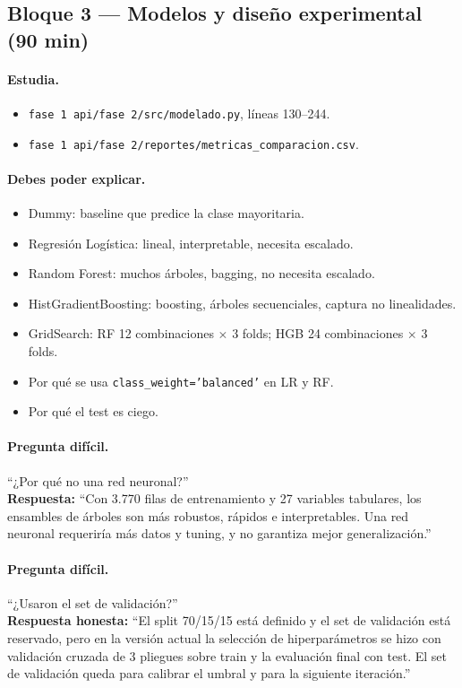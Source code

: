 \documentclass[11pt,a4paper]{article}
\newcommand{\code}[1]{\texttt{#1}}
\begin{document}
\subsection{Bloque 3 --- Modelos y diseño experimental (90 min)}

\paragraph{Estudia.}
\begin{itemize}[leftmargin=*]
  \item \code{fase 1 api/fase 2/src/modelado.py}, líneas 130--244.
  \item \code{fase 1 api/fase 2/reportes/metricas_comparacion.csv}.
\end{itemize}

\paragraph{Debes poder explicar.}
\begin{itemize}[leftmargin=*]
  \item Dummy: baseline que predice la clase mayoritaria.
  \item Regresión Logística: lineal, interpretable, necesita escalado.
  \item Random Forest: muchos árboles, bagging, no necesita escalado.
  \item HistGradientBoosting: boosting, árboles secuenciales, captura no linealidades.
  \item GridSearch: RF 12 combinaciones $\times$ 3 folds; HGB 24 combinaciones $\times$ 3 folds.
  \item Por qué se usa \code{class_weight='balanced'} en LR y RF.
  \item Por qué el test es ciego.
\end{itemize}

\paragraph{Pregunta difícil.}
``¿Por qué no una red neuronal?''\\
\textbf{Respuesta:} ``Con 3.770 filas de entrenamiento y 27 variables tabulares, los ensambles de árboles son más robustos, rápidos e interpretables. Una red neuronal requeriría más datos y tuning, y no garantiza mejor generalización.''

\paragraph{Pregunta difícil.}
``¿Usaron el set de validación?''\\
\textbf{Respuesta honesta:} ``El split 70/15/15 está definido y el set de validación está reservado, pero en la versión actual la selección de hiperparámetros se hizo con validación cruzada de 3 pliegues sobre train y la evaluación final con test. El set de validación queda para calibrar el umbral y para la siguiente iteración.''
\end{document}
